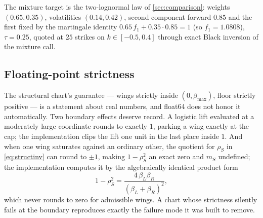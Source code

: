 The mixture target is the two-lognormal law of \cref{sec:comparison}:
weights $(0.65,0.35)$, volatilities $(0.14,0.42)$, second component
forward $0.85$ and the first fixed by the martingale identity
$0.65\,f_1+0.35\cdot0.85=1$ (so $f_1=1.0808$), $\tau=0.25$, quoted at
$25$ strikes on $k\in[-0.5,0.4]$ through exact Black inversion of the
mixture call.

\subsection*{Floating-point strictness}

The structural chart's guarantee --- wings strictly inside
$(0,\beta_{\max})$, floor strictly positive --- is a statement about
real numbers, and float64 does not honor it automatically.  Two
boundary effects deserve record.  A logistic lift evaluated at a
moderately large coordinate rounds to exactly $1$, parking a wing
exactly at the cap; the implementation clips the lift one unit in the
last place inside $1$.  And when one wing saturates against an
ordinary other, the quotient for $\rho_S$ in \eqref{eq:structinv} can
round to $\pm1$, making $1-\rho_S^2$ an exact zero and $m_S$
undefined; the implementation computes it by the algebraically
identical product form
\[
1-\rho_S^2=\frac{4\,\beta_L\beta_R}{(\beta_L+\beta_R)^2},
\]
which never rounds to zero for admissible wings.  A chart whose
strictness silently fails at the boundary reproduces exactly the
failure mode it was built to remove.
